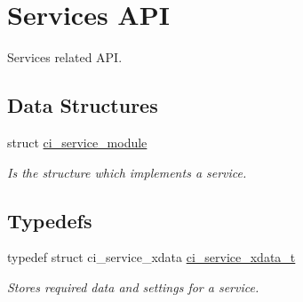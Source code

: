\hypertarget{group__SERVICES}{
\section{Services API}
\label{group__SERVICES}
}


Services related API.  
\subsection*{Data Structures}
\begin{DoxyCompactItemize}
\item 
struct \hyperlink{structci__service__module}{ci\_\-service\_\-module}
\begin{DoxyCompactList}\small\item\em Is the structure which implements a service. \item\end{DoxyCompactList}\end{DoxyCompactItemize}
\subsection*{Typedefs}
\begin{DoxyCompactItemize}
\item 
\hypertarget{group__SERVICES_ga033e7bb0a88b3619abbc17230ad98eb4}{
typedef struct ci\_\-service\_\-xdata \hyperlink{group__SERVICES_ga033e7bb0a88b3619abbc17230ad98eb4}{ci\_\-service\_\-xdata\_\-t}}
\label{group__SERVICES_ga033e7bb0a88b3619abbc17230ad98eb4}

\begin{DoxyCompactList}\small\item\em Stores required data and settings for a service. \item\end{DoxyCompactList}\end{DoxyCompactItemize}
